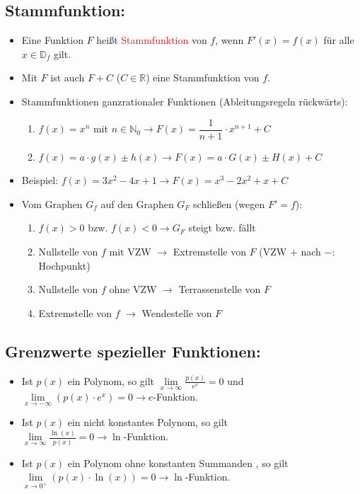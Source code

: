 \subsection{Stammfunktion:}
\begin{itemize}
\item Eine Funktion $F$ heißt \textcolor{red}{Stammfunktion} von $f$, wenn $F'(x) = f(x)$ für alle $x\in\mathds{D}_f$ gilt.
\item Mit $F$ ist auch $F + C$ ($C\in\mathds{R}$) eine Stammfunktion von $f$.
\item Stammfunktionen ganzrationaler Funktionen (Ableitungsregeln rückwärts):\\
\begin{enumerate}
\item $f(x) = x^n$ mit $n\in\mathds{N}_0 \longrightarrow F(x) = \dfrac{1}{n+1}\cdot x^{n+1} + C$\\
\item $f(x) = a\cdot g(x) \pm h(x) \longrightarrow F(x) = a\cdot G(x) \pm H(x) + C$
\end{enumerate}
\item Beispiel: $f(x) = 3x^2 - 4x + 1 \longrightarrow F(x) = x^3 - 2x^2 + x + C$
\item Vom Graphen $G_f$ auf den Graphen $G_F$ schließen (wegen $F' = f$):\\
\begin{enumerate}
\item $f(x) > 0$ bzw. $f(x) < 0 \longrightarrow G_F$ steigt bzw. fällt\\
\item Nullstelle von $f$ mit VZW $\longrightarrow$ Extremstelle von $F$ (VZW $+$ nach $-$: Hochpunkt)\\
\item Nullstelle von $f$ ohne VZW $\longrightarrow$ Terrassenstelle von $F$\\
\item Extremstelle von $f$ $\longrightarrow$ Wendestelle von $F$
\end{enumerate}
\end{itemize}
\subsection{Grenzwerte spezieller Funktionen:}
\begin{itemize}
\item Ist $p(x)$ ein Polynom, so gilt $\lim \limits_{x\longrightarrow \infty} \frac{p(x)}{e^x} = 0$ und $\lim \limits_{x\longrightarrow -\infty} \left(p(x)\cdot e^x\right) = 0 \longrightarrow e$-Funktion.
\item Ist $p(x)$ ein nicht konstantes Polynom, so gilt \\$\lim \limits_{x\longrightarrow \infty} \frac{\ln(x)}{p(x)} = 0 \longrightarrow \ln$-Funktion.
\item Ist $p(x)$ ein Polynom ohne konstanten Summanden , so gilt \\$\lim \limits_{x\longrightarrow 0^+} (p(x)\cdot \ln(x)) = 0\longrightarrow \ln$-Funktion.
\end{itemize}
